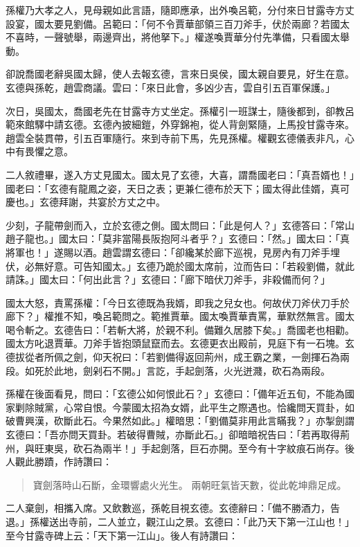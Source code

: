 孫權乃大孝之人，見母親如此言語，隨即應承，出外喚呂範，分付來日甘露寺方丈設宴，國太要見劉備。呂範曰：「何不令賈華部領三百刀斧手，伏於兩廊？若國太不喜時，一聲號舉，兩邊齊出，將他拏下。」權遂喚賈華分付先準備，只看國太舉動。

卻說喬國老辭吳國太歸，使人去報玄德，言來日吳侯，國太親自要見，好生在意。玄德與孫乾，趙雲商議。雲曰：「來日此會，多凶少吉，雲自引五百軍保護。」

次日，吳國太，喬國老先在甘露寺方丈坐定。孫權引一班謀士，隨後都到，卻教呂範來館驛中請玄德。玄德內披細鎧，外穿錦袍，從人背劍緊隨，上馬投甘露寺來。趙雲全裝貫帶，引五百軍隨行。來到寺前下馬，先見孫權。權觀玄德儀表非凡，心中有畏懼之意。

二人敘禮畢，遂入方丈見國太。國太見了玄德，大喜，謂喬國老曰：「真吾婿也！」國老曰：「玄德有龍鳳之姿，天日之表；更兼仁德布於天下；國太得此佳婿，真可慶也。」玄德拜謝，共宴於方丈之中。

少刻，子龍帶劍而入，立於玄德之側。國太問曰：「此是何人？」玄德答曰：「常山趙子龍也。」國太曰：「莫非當陽長阪抱阿斗者乎？」玄德曰：「然。」國太曰：「真將軍也！」遂賜以酒。趙雲謂玄德曰：「卻纔某於廊下巡視，見房內有刀斧手埋伏，必無好意。可告知國太。」玄德乃跪於國太席前，泣而告曰：「若殺劉備，就此請誅。」國太曰：「何出此言？」玄德曰：「廊下暗伏刀斧手，非殺備而何？」

國太大怒，責罵孫權：「今日玄德既為我婿，即我之兒女也。何故伏刀斧伏刀手於廊下？」權推不知，喚呂範問之。範推賈華。國太喚賈華責罵，華默然無言。國太喝令斬之。玄德告曰：「若斬大將，於親不利。備難久居膝下矣。」喬國老也相勸。國太方叱退賈華。刀斧手皆抱頭鼠竄而去。玄德更衣出殿前，見庭下有一石塊。玄德拔從者所佩之劍，仰天祝曰：「若劉備得返回荊州，成王霸之業，一劍揮石為兩段。如死於此地，劍剁石不開。」言訖，手起劍落，火光迸濺，砍石為兩段。

孫權在後面看見，問曰：「玄德公如何恨此石？」玄德曰：「備年近五旬，不能為國家剿除賊黨，心常自恨。今蒙國太招為女婿，此平生之際遇也。恰纔問天買卦，如破曹興漢，砍斷此石。今果然如此。」權暗思：「劉備莫非用此言瞞我？」亦掣劍謂玄德曰：「吾亦問天買卦。若破得曹賊，亦斷此石。」卻暗暗祝告曰：「若再取得荊州，與旺東吳，砍石為兩半！」手起劍落，巨石亦開。至今有十字紋痕石尚存。後人觀此勝蹟，作詩讚曰：

\begin{quote}
寶劍落時山石斷，金環響處火光生。
兩朝旺氣皆天數，從此乾坤鼎足成。
\end{quote}

二人棄劍，相攜入席。又飲數巡，孫乾目視玄德。玄德辭曰：「備不勝酒力，告退。」孫權送出寺前，二人並立，觀江山之景。玄德曰：「此乃天下第一江山也！」至今甘露寺碑上云：「天下第一江山」。後人有詩讚曰：

